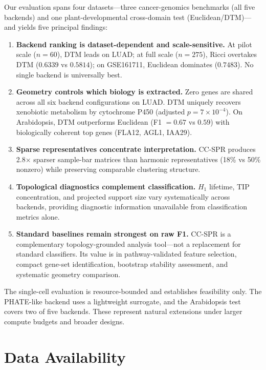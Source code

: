 \documentclass[11pt]{article}
\begin{document}
Our evaluation spans four datasets---three cancer-genomics benchmarks (all five backends) and one plant-developmental cross-domain test (Euclidean/DTM)---and yields five principal findings:
\begin{enumerate}[leftmargin=1.5em]
\item \textbf{Backend ranking is dataset-dependent and scale-sensitive.}
At pilot scale ($n = 60$), DTM leads on LUAD; at full scale ($n = 275$), Ricci overtakes DTM ($0.6339$ vs $0.5814$); on GSE161711, Euclidean dominates ($0.7483$).
No single backend is universally best.
\item \textbf{Geometry controls which biology is extracted.}
Zero genes are shared across all six backend configurations on LUAD.
DTM uniquely recovers xenobiotic metabolism by cytochrome P450 (adjusted $p = 7 \times 10^{-4}$).
On Arabidopsis, DTM outperforms Euclidean (F1 $= 0.67$ vs $0.59$) with biologically coherent top genes (FLA12, AGL1, IAA29).
\item \textbf{Sparse representatives concentrate interpretation.}
CC-SPR produces 2.8$\times$ sparser sample-bar matrices than harmonic representatives (18\% vs 50\% nonzero) while preserving comparable clustering structure.
\item \textbf{Topological diagnostics complement classification.}
$H_1$ lifetime, TIP concentration, and projected support size vary systematically across backends, providing diagnostic information unavailable from classification metrics alone.
\item \textbf{Standard baselines remain strongest on raw F1.}
CC-SPR is a complementary topology-grounded analysis tool---not a replacement for standard classifiers.
Its value is in pathway-validated feature selection, compact gene-set identification, bootstrap stability assessment, and systematic geometry comparison.
\end{enumerate}

The single-cell evaluation is resource-bounded and establishes feasibility only.
The PHATE-like backend uses a lightweight surrogate, and the Arabidopsis test covers two of five backends.
These represent natural extensions under larger compute budgets and broader designs.

\section*{Data Availability}
\end{document}
